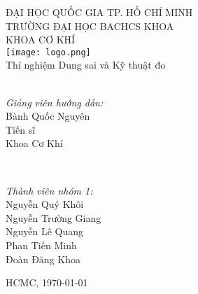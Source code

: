 	\begin{titlepage}
		\centering
		\small ĐẠI HỌC QUỐC GIA TP. HỒ CHÍ MINH \\
		TRƯỜNG ĐẠI HỌC BACHCS KHOA\\
		KHOA CƠ KHÍ\\[0.1\linewidth]
		
		\texttt{[image: logo.png]}\\[0.1\linewidth]	%
		\normalsize Thí nghiệm Dung sai và Kỹ thuật đo\\[0.05\linewidth]
		{\huge \bfseries \thetitle}\\[0.2\linewidth]
		
		\begin{minipage}[t]{0.4\textwidth}
		\begin{flushleft} \large
				\emph{Giảng viên hướng dẫn:}\\
				Bành Quốc Nguyên\\
				Tiến sĩ\\
				Khoa Cơ Khí\\
			\end{flushleft}
		\end{minipage}~
	\begin{minipage}[t]{0.4\textwidth}
	
	\begin{flushright} \large
		\emph{Thành viên nhóm 1:} \\
		Nguyễn Quý Khôi\\
		Nguyễn Trường Giang\\
		Nguyễn Lê Quang\\
		Phan Tiến Minh\\
		Đoàn Đăng Khoa
	\end{flushright}
			
		\end{minipage}
		\mbox{}\vfill
		{\large HCMC, \today}
	\end{titlepage}